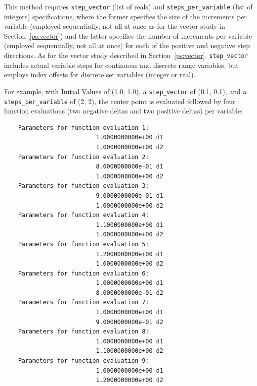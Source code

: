 This method requires \texttt{step\_vector} (list of reals) and
\texttt{steps\_per\_variable} (list of integers) specifications, where 
the former specifies the size of the increments per variable (employed
sequentially, not all at once as for the vector study in
Section~\ref{ps:vector}) and the latter specifies the number of
increments per variable (employed sequentially, not all at once) for
each of the positive and negative step directions.  As for the vector
study described in Section~\ref{ps:vector}, \texttt{step\_vector}
includes actual variable steps for continuous and discrete range
variables, but employs index offsets for discrete set variables
(integer or real).

For example, with Initial Values of (1.0, 1.0), a \texttt{step\_vector} 
of (0.1, 0.1), and a \texttt{steps\_per\_variable} of (2, 2), the 
center point is evaluated followed by four function evaluations (two 
negative deltas and two positive deltas) per variable:
\begin{small}
\begin{verbatim}
    Parameters for function evaluation 1:
                          1.0000000000e+00 d1
                          1.0000000000e+00 d2
    Parameters for function evaluation 2:
                          8.0000000000e-01 d1
                          1.0000000000e+00 d2
    Parameters for function evaluation 3:
                          9.0000000000e-01 d1
                          1.0000000000e+00 d2
    Parameters for function evaluation 4:
                          1.1000000000e+00 d1
                          1.0000000000e+00 d2
    Parameters for function evaluation 5:
                          1.2000000000e+00 d1
                          1.0000000000e+00 d2
    Parameters for function evaluation 6:
                          1.0000000000e+00 d1
                          8.0000000000e-01 d2
    Parameters for function evaluation 7:
                          1.0000000000e+00 d1
                          9.0000000000e-01 d2
    Parameters for function evaluation 8:
                          1.0000000000e+00 d1
                          1.1000000000e+00 d2
    Parameters for function evaluation 9:
                          1.0000000000e+00 d1
                          1.2000000000e+00 d2
\end{verbatim}
\end{small}

